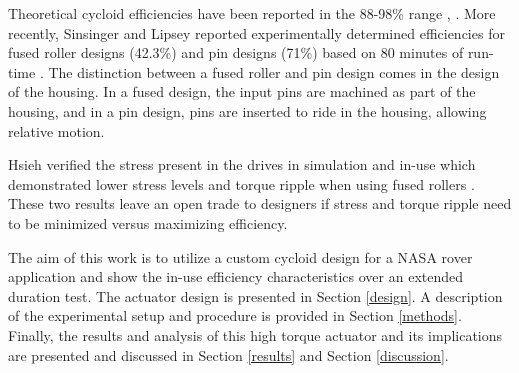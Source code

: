 Theoretical cycloid efficiencies have been reported in the 88-98\% range \cite{Malhorta}, \cite{unified_approach}.
More recently, Sinsinger and Lipsey reported experimentally determined efficiencies for fused roller designs (42.3\%) and pin designs (71\%) based on 80 minutes of run-time \cite{cycloid_vs_harmonic}.
The distinction between a fused roller and pin design comes in the design of the housing.
In a fused design, the input pins are machined as part of the housing, and in a pin design, pins are inserted to ride in the housing, allowing relative motion.

Hsieh verified the stress present in the drives in simulation and in-use which demonstrated lower stress levels and torque ripple when using fused rollers \cite{hsieh_dynamics}.
These two results leave an open trade to designers if stress and torque ripple need to be minimized versus maximizing efficiency.

The aim of this work is to utilize a custom cycloid design for a NASA rover application and show the in-use efficiency characteristics over an extended duration test.
The actuator design is presented in Section \ref{design}.
A description of the experimental setup and procedure is provided in Section \ref{methods}.
Finally, the results and analysis of this high torque actuator and its implications are presented and discussed in Section \ref{results} and Section \ref{discussion}.

